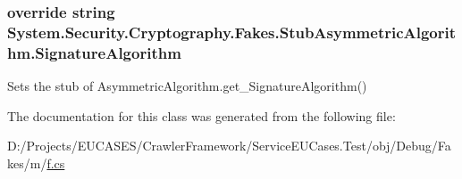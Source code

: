 \hypertarget{class_system_1_1_security_1_1_cryptography_1_1_fakes_1_1_stub_asymmetric_algorithm_a51ec3aa5da1b6cf2ed544f57e4d1bf3c}{
\subsubsection[{Signature\-Algorithm}]{\setlength{\rightskip}{0pt plus 5cm}override string System.\-Security.\-Cryptography.\-Fakes.\-Stub\-Asymmetric\-Algorithm.\-Signature\-Algorithm\hspace{0.3cm}{\ttfamily [get]}}}\label{class_system_1_1_security_1_1_cryptography_1_1_fakes_1_1_stub_asymmetric_algorithm_a51ec3aa5da1b6cf2ed544f57e4d1bf3c}


Sets the stub of Asymmetric\-Algorithm.\-get\-\_\-\-Signature\-Algorithm()



The documentation for this class was generated from the following file\-:\begin{DoxyCompactItemize}
\item 
D\-:/\-Projects/\-E\-U\-C\-A\-S\-E\-S/\-Crawler\-Framework/\-Service\-E\-U\-Cases.\-Test/obj/\-Debug/\-Fakes/m/\hyperlink{m_2f_8cs}{f.\-cs}\end{DoxyCompactItemize}
